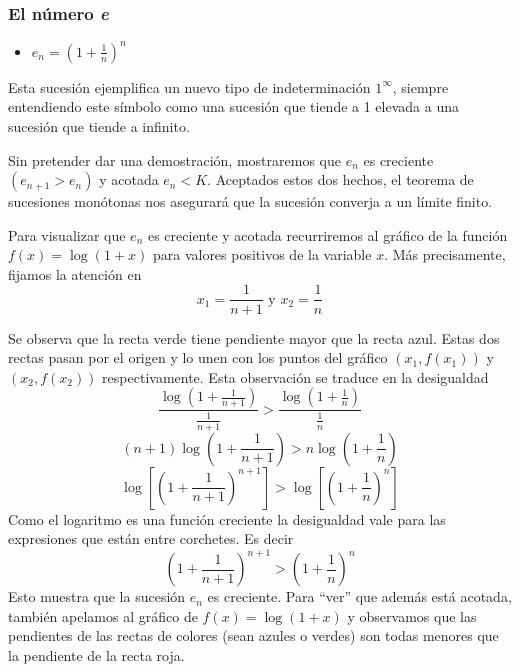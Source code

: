 \documentclass[../teoria.root.tex]{subfiles}
\begin{document}
\subsubsection{El número \textit{e}}
\begin{itemize}
    \item \(e_n=\left(1+\frac{1}{n}\right)^n\)
\end{itemize}
Esta sucesión ejemplifica un nuevo tipo de indeterminación \(1^\infty\), siempre entendiendo este símbolo como una sucesión que tiende a 1 elevada a una sucesión que tiende a infinito.

Sin pretender dar una demostración, mostraremos que \(e_n\) es creciente \((e_{n+1}>e_n)\) y acotada \(e_n<K\).
Aceptados estos dos hechos, el teorema de sucesiones monótonas nos asegurará que la sucesión converja a un límite finito.

Para visualizar que \(e_n\) es creciente y acotada recurriremos al gráfico de la función \(f(x)=\log(1+x)\) para valores positivos de la variable \(x\).
Más precisamente, fijamos la atención en \[x_1=\frac{1}{n+1}\text{ y }x_2=\frac{1}{n}\]
\begin{center}
    \begin{scaletikzpicturetowidth}{\linewidth}
    \end{scaletikzpicturetowidth}
\end{center}
Se observa que la recta verde tiene pendiente mayor que la recta azul.
Estas dos rectas pasan por el origen y lo unen con los puntos del gráfico \((x_1,f(x_1))\) y \((x_2,f(x_2))\) respectivamente.
Esta observación se traduce en la desigualdad
\[\frac{\log\left(1+\frac{1}{n+1}\right)}{\frac{1}{n+1}}>\frac{\log\left(1+\frac{1}{n}\right)}{\frac{1}{n}}\]
\[(n+1)\log\left(1+\frac{1}{n+1}\right)>n\log\left(1+\frac{1}{n}\right)\]
\[\log\left[\left(1+\frac{1}{n+1}\right)^{n+1}\right]>\log\left[\left(1+\frac{1}{n}\right)^n\right]\]
Como el logaritmo es una función creciente la desigualdad vale para las expresiones que están entre corchetes.
Es decir \[\left(1+\frac{1}{n+1}\right)^{n+1}>\left(1+\frac{1}{n}\right)^n\]
Esto muestra que la sucesión \(e_n\) es creciente.
Para “ver” que además está acotada, también apelamos al gráfico de \(f(x)=\log(1+x)\) y observamos que las pendientes de las rectas de colores (sean azules o verdes) son todas menores que la pendiente de la recta roja.
\end{document}
